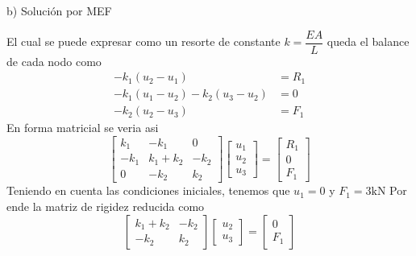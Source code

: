 \begin{desarrollo}{b) Soluci\'on por MEF}
\begin{center}
\label{fig:malla2}
\end{center}
El cual se puede expresar como un resorte de constante $k=\dfrac{EA}{L}$
queda el balance de cada nodo como
\begin{align*}
    -k_1(u_2-u_1)&=R_1\\
    -k_1(u_1-u_2)-k_2(u_3-u_2)&=0\\
    -k_2(u_2-u_3)&=F_1
\end{align*}
En forma matricial se veria asi
$$\begin{bmatrix}
    k_1&-k_1&0\\
    -k_1&k_1+k_2&-k_2\\
    0&-k_2&k_2
\end{bmatrix}\begin{bmatrix}
    u_1\\
    u_2\\
    u_3
\end{bmatrix}=\begin{bmatrix}
    R_1\\
    0\\
    F_1
\end{bmatrix}$$
Teniendo en cuenta las condiciones iniciales, tenemos que $u_1=0$ y $F_1=3\text{kN}$
Por ende la matriz de rigidez reducida como\\




$$\begin{bmatrix}

k_1+k_2&-k_2\\
-k_2&k_2
\end{bmatrix}\begin{bmatrix}

    u_2\\
    u_3
\end{bmatrix}=\begin{bmatrix}

    0\\
    F_1
\end{bmatrix}$$


\end{desarrollo}
